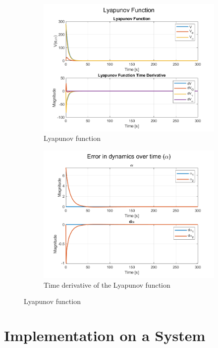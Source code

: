 \begin{figure}[!t]
    \centering
    \begin{subfigure}[b]{0.49\linewidth}
     \centering
     \includegraphics[width=\linewidth]{images/sine/NMRAC_MIMO_Lyapunov.png}
     \caption{Lyapunov function}
     \label{fig:Lyapunov-step-input}
    \end{subfigure}
    \hfill
    \begin{subfigure}[b]{0.49\linewidth}
     \centering
     \includegraphics[width=\linewidth]{images/sine/NMRAC_MIMO_Alpha.png}
     \caption{Time derivative of the Lyapunov function}
     \label{fig:step-error}
    \end{subfigure}
    \caption{Lyapunov function}
    \label{fig:step-lyap}
\end{figure}

\section{Implementation on a System}
